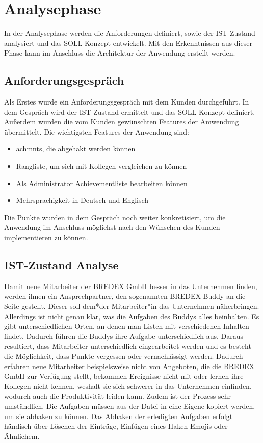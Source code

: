\documentclass[11pt]{article}
\begin{document}
%
%

\section{Analysephase}
In der Analysephase werden die Anforderungen definiert, sowie der IST-Zustand analysiert und das
SOLL-Konzept entwickelt. Mit den Erkenntnissen aus dieser Phase kann im Anschluss die Architektur 
der Anwendung erstellt werden.

\subsection{Anforderungsgespräch}
Als Erstes wurde ein Anforderungsgespräch mit dem Kunden durchgeführt.
In dem Gespräch wird der IST-Zustand ermittelt und das SOLL-Konzept definiert.
Außerdem wurden die vom Kunden gewünschten Features der Amwendung übermittelt.
Die wichtigsten Features der Anwendung sind:

\begin{itemize} 
    \item \glspl{achmnt}, die abgehakt werden können
    \item Rangliste, um sich mit Kollegen vergleichen zu können
    \item Als Administrator Achievementliste bearbeiten können 
    \item Mehrsprachigkeit in Deutsch und Englisch
\end{itemize}

Die Punkte wurden in dem Gespräch noch weiter konkretisiert, um die Anwendung
im Anschluss möglichst nach den Wünschen des Kunden implementieren zu können.


\subsection{IST-Zustand Analyse}

Damit neue Mitarbeiter der BREDEX GmbH besser in das Unternehmen
finden, werden ihnen ein Ansprechpartner, den sogenannten BREDEX-Buddy
an die Seite gestellt. Dieser soll dem*der Mitarbeiter*in das Unternehmen
näherbringen. Allerdings ist nicht genau klar, was die Aufgaben des Buddys
alles beinhalten. Es gibt unterschiedlichen Orten, an denen man Listen mit
verschiedenen Inhalten findet. 
Dadurch führen die Buddys ihre Aufgabe unterschiedlich aus. Daraus resultiert, 
dass Mitarbeiter unterschiedlich eingearbeitet werden und es besteht die
Möglichkeit, dass Punkte vergessen oder vernachlässigt werden. Dadurch erfahren neue Mitarbeiter beispielsweise nicht
von Angeboten, die die BREDEX GmbH zur Verfügung stellt, bekommen Ereignisse nicht mit oder lernen ihre Kollegen nicht kennen,
weshalt sie sich schwerer in das Unternehmen einfinden, wodurch auch die Produktivität leiden kann. \newline %
Zudem ist der Prozess sehr umständlich. Die Aufgaben müssen aus der Datei in eine Eigene kopiert werden,
um sie abhaken zu können. Das Abhaken der erledigten Aufgaben erfolgt händisch über Löschen der Einträge, 
Einfügen eines Haken-Emojis oder Ähnlichem. 
\end{document}
